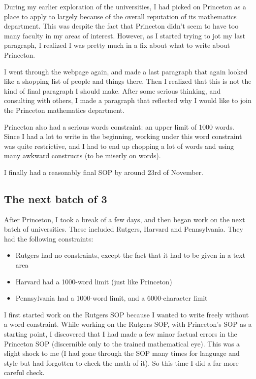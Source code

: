 \documentclass[a4paper]{amsart}
\begin{document}
During my earlier exploration of the universities, I had picked on
Princeton as a place to apply to largely because of the overall
reputation of its mathematics department. This was despite the fact
that Princeton didn't seem to have too many faculty in my areas of
interest. However, as I started trying to jot my last paragraph, I
realized I was pretty much in a fix about what to write about Princeton.

I went through the webpage again, and made a last paragraph that again
looked like a shopping list of people and things there. Then I
realized that this is not the kind of final paragraph I should
make. After some serious thinking, and consulting with others, I made
a paragraph that reflected why I would like to join the Princeton mathematics
department.

Princeton also had a serious words constraint: an upper limit of 1000
words.  Since I had a lot to write in the beginning, working under
this word constraint was quite restrictive, and I had to end up
chopping a lot of words and using many awkward constructs (to be
miserly on words).

I finally had a reasonably final SOP by around 23rd of November.

\subsection{The next batch of 3}

After Princeton, I took a break of a few days, and then began work on
the next batch of universities. These included Rutgers, Harvard and
Pennsylvania. They had the following constraints:

\begin{itemize}

\item Rutgers had no constraints, except the fact that it had to be given
  in a text area

\item Harvard had a 1000-word limit (just like Princeton)

\item Pennsylvania had a 1000-word limit, and a 6000-character limit

\end{itemize}

I first started work on the Rutgers SOP because I wanted to write
freely without a word constraint. While working on the Rutgers SOP,
with Princeton's SOP as a starting point, I discovered that I had made
a few minor factual errors in the Princeton SOP (discernible only to
the trained mathematical eye). This was a slight shock to me (I had
gone through the SOP many times for language and style but had
forgotten to check the math of it). So this time I did a far more
careful check.
\end{document}

